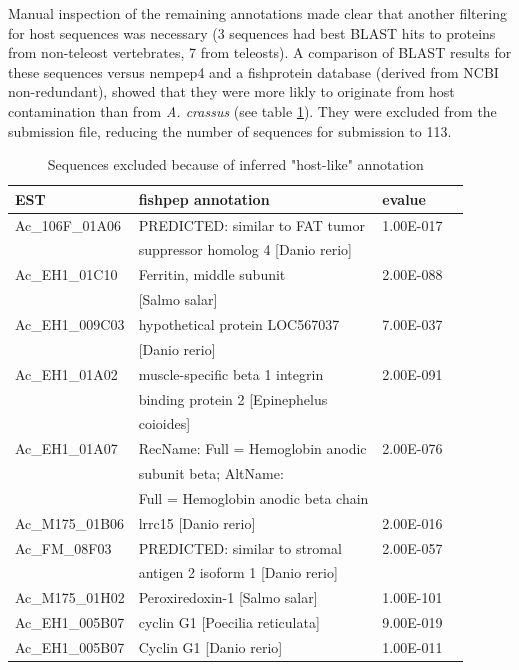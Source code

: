 \documentclass[12pt,a4paper]{article}
\begin{document}
Manual inspection of the remaining annotations made clear that another
filtering for host sequences was necessary (3 sequences had best BLAST
hits to proteins from non-teleost vertebrates, 7 from teleosts). A
comparison of BLAST results for these sequences versus nempep4 and a
fishprotein database (derived from NCBI non-redundant), showed that
they were more likly to originate from host contamination than from
\textit{A. crassus} (see table \ref{tab:hostex}). They were excluded
from the submission file, reducing the number of sequences for
submission to 113.

\begin{table}[ht]
  \centering
  \begin{tabular}{llll} 
    EST&fishpep annotation&evalue\\
    \hline
    Ac\_106F\_01A06& PREDICTED: similar to FAT tumor&1.00E-017\\
    &suppressor homolog 4 [Danio rerio]\\
    Ac\_EH1\_01C10 &Ferritin,  middle subunit       &2.00E-088  \\ 
    & [Salmo salar]                    \\ 
    Ac\_EH1\_009C03&hypothetical protein LOC567037  &7.00E-037  \\ 
    & [Danio rerio]                    \\ 
    Ac\_EH1\_01A02&muscle-specific beta 1 integrin  &2.00E-091  \\ 
    &binding protein 2 [Epinephelus      \\ 
    &coioides]                           \\ 
    Ac\_EH1\_01A07&RecName: Full = Hemoglobin anodic  &2.00E-076  \\ 
    &subunit beta; AltName:            \\ 
    &Full = Hemoglobin anodic beta chain \\ 
    Ac\_M175\_01B06&lrrc15 [Danio rerio]            &2.00E-016  \\ 
    Ac\_FM\_08F03 &PREDICTED: similar to stromal    &2.00E-057  \\ 
    &antigen 2 isoform 1 [Danio rerio] \\ 
    Ac\_M175\_01H02&Peroxiredoxin-1 [Salmo salar]   &1.00E-101  \\ 
    Ac\_EH1\_005B07&cyclin G1 [Poecilia reticulata] &9.00E-019  \\ 
    Ac\_EH1\_005B07&Cyclin G1 [Danio rerio]         &1.00E-011  \\ 
    \hline 
\end{tabular}   
\caption{Sequences excluded because of inferred "host-like" annotation}
\label{tab:hostex}
\end{table}
\end{document}
